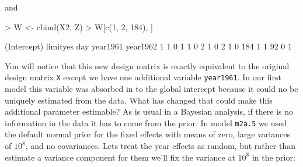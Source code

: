 \documentclass{article}
\begin{document}
and

\begin{Schunk}
\begin{Sinput}
> W <- cbind(X2, Z)
> W[c(1, 2, 184), ]
\end{Sinput}
\begin{Soutput}
    (Intercept) limityes day year1961 year1962
1             1        0   1        1        0
2             1        0   2        1        0
184           1        1  92        0        1
\end{Soutput}
\end{Schunk}

You will notice that this new design matrix is  exactly equivalent to the original design matrix \texttt{X} except we have one additional variable \texttt{year1961}. In our first model this variable was absorbed in to the global intercept because it could no be uniquely estimated from the data. What has changed that could make this additional parameter estimable?  As is usual in a Bayesian analysis, if there is no information in the data it has to come from the prior. In model \texttt{m2a.5} we used the default normal prior for the fixed effects with means of zero, large variances of $10^{8}$, and no covariances. Lets treat the year effects as random, but rather than estimate a variance component for them we'll fix the variance  at $10^{8}$ in the prior:

\begin{Schunk}
\end{Schunk}
\end{document}
